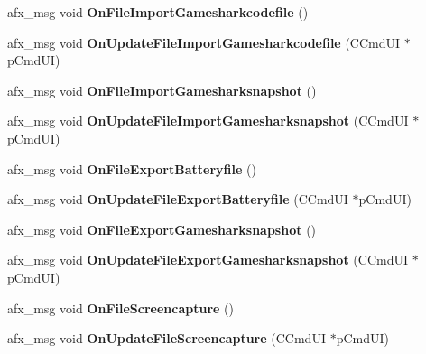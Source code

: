 \begin{DoxyCompactItemize}
\item 
\mbox{\label{class_main_wnd_a3e7abf73687cb0dbf61c3707de5e10f4}} 
afx\+\_\+msg void {\bfseries On\+File\+Import\+Gamesharkcodefile} ()
\item 
\mbox{\label{class_main_wnd_aec0517b8da64f0752ce975f0ac84d8a1}} 
afx\+\_\+msg void {\bfseries On\+Update\+File\+Import\+Gamesharkcodefile} (C\+Cmd\+UI $\ast$p\+Cmd\+UI)
\item 
\mbox{\label{class_main_wnd_a1ba9d10fce306e309613d8e06097219c}} 
afx\+\_\+msg void {\bfseries On\+File\+Import\+Gamesharksnapshot} ()
\item 
\mbox{\label{class_main_wnd_a12a769f8883bf0abc2e51764b6969ecd}} 
afx\+\_\+msg void {\bfseries On\+Update\+File\+Import\+Gamesharksnapshot} (C\+Cmd\+UI $\ast$p\+Cmd\+UI)
\item 
\mbox{\label{class_main_wnd_a0da8957d2bcd55859914b0013c6d21f7}} 
afx\+\_\+msg void {\bfseries On\+File\+Export\+Batteryfile} ()
\item 
\mbox{\label{class_main_wnd_af5aa05b853a2792f8448f2e331c5e44a}} 
afx\+\_\+msg void {\bfseries On\+Update\+File\+Export\+Batteryfile} (C\+Cmd\+UI $\ast$p\+Cmd\+UI)
\item 
\mbox{\label{class_main_wnd_ae567674cd79ab30eb420af2f91f5688c}} 
afx\+\_\+msg void {\bfseries On\+File\+Export\+Gamesharksnapshot} ()
\item 
\mbox{\label{class_main_wnd_a2ec36732add704ab58b3c2a05e336d3b}} 
afx\+\_\+msg void {\bfseries On\+Update\+File\+Export\+Gamesharksnapshot} (C\+Cmd\+UI $\ast$p\+Cmd\+UI)
\item 
\mbox{\label{class_main_wnd_a869b47c3aae70c534109b9a8310e1faf}} 
afx\+\_\+msg void {\bfseries On\+File\+Screencapture} ()
\item 
\mbox{\label{class_main_wnd_a5b9a0551c29d223054e314f8018e0ab9}} 
afx\+\_\+msg void {\bfseries On\+Update\+File\+Screencapture} (C\+Cmd\+UI $\ast$p\+Cmd\+UI)
\item 

\end{DoxyCompactItemize}
